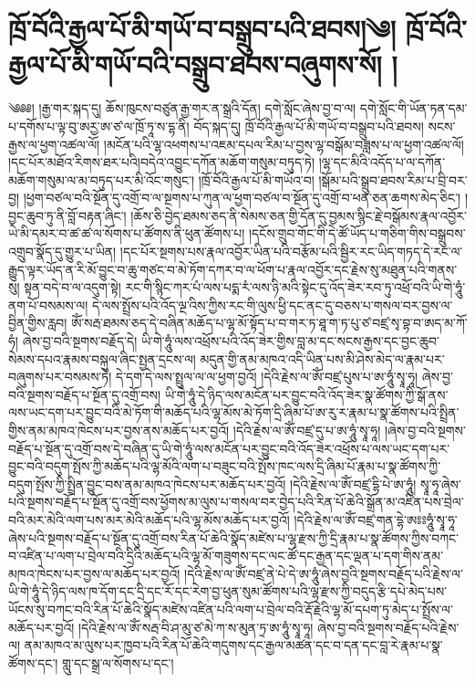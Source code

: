 \chapter{ཁྲོ་བོའི་རྒྱལ་པོ་མི་གཡོ་བ་བསྒྲུབ་པའི་ཐབས།༄། ཁྲོ་བོའི་རྒྱལ་པོ་མི་གཡོ་བའི་བསྒྲུབ་ཐབས་བཞུགས་སོ། ། }༄༅༅། །རྒྱ་གར་སྐད་དུ། ཆོས་ཁུངས་བཙུན་རྒྱ་གར་ན་སྒྲའི་དོན། དགེ་སློང་ཞེས་བྱ་བ་ལ། དགེ་སློང་གི་ཡོན་ཏན་དམ་པ་དགོས་པ་ལྟ་བུ་ཨརྱ་ཨ་ཙ་ལ་ཁྲོ་ཏཱ་ས་དྷ་ནི། བོད་སྐད་དུ། ཁྲོ་བོའི་རྒྱལ་པོ་མི་གཡོ་བ་བསྒྲུབ་པའི་ཐབས། སངས་རྒྱས་ལ་ཕྱག་འཚལ་ལོ། །མངོན་པའི་ལྷ་འཕགས་པ་འཇམ་དཔལ་རིམ་པ་བྱས་ལྷ་བསྒོམ་བཟླས་པ་ལ་ཕྱག་འཚལ་ལོ། །དང་པོར་མཐོའ་རིགས་ཐར་པའི།བདེའ་འབྱུང་དཀོན་མཆོག་གསུམ་བཏུད་ཏེ། །ལྷ་དང་མིའི་འདོད་པ་ལ་དཀོན་མཆོག་གསུམ་ལ་མ་བཏུད་པར་མི་འོང་གསུང་། །ཁྲོ་བོའི་རྒྱལ་པོ་མི་གཡོའ་བ། །སྒོམ་པའི་སྒྲུབ་ཐབས་རིམ་པ་བྲི་བར་བྱ། །ཕྱག་བཙལ་བའི་སྔོན་དུ་འགྲོ་བ་ལ་སྔགས་པ་ཀུན་ལ་ཕྱག་བཙལ་བ་སྔོན་དུ་འགྲོ་བ་ཕན་ཅན་ཆགས་མེད་ཅིང་། །བྱང་ཆུབ་ཏུ་ནི་བློ་བརྟན་ཞིང་། །ཆོས་ཅི་བྱེད་ཐམས་ཅད་ནི་སེམས་ཅན་གྱི་དོན་དུ་བྱམས་སྙིང་རྗེ་བསྒོམས་རྣལ་འབྱོར་ཡེ་མི་དམར་བ་ཚ་ཚ་ལ་སོགས་པ་ཚོགས་ནི་ཕུན་ཚོགས་པ། །དངོས་གྲུབ་གོང་གི་དེ་ཚོ་ཡོད་པ་གཅིག་གིས་བསྒྲུབས་འགྲུབ་སྣོད་དུ་གྱུར་པ་ཡིན། །དང་པོར་སྔགས་པས་རྣལ་འབྱོར་ཡིན་པའི་བརྩོམ་པའི་སྦྱིར་རང་ཡིད་གཏད་དེ་རང་ལ་རྒྱུད་ལྟར་ཡོད་ན་རི་མོ་བྱུང་བ་ཆུ་གཙང་བ་མེ་ཏོག་དཀར་བ་ལ་ཕོག་པ་རྣལ་འབྱོར་དང་རྗེས་སུ་མཐུན་པའི་གནས་སུ། སྟན་བདེ་བ་ལ་འདུག་སྟེ། རང་གི་སྙིང་ཀར་པཾ་ལས་པདྨ་རཾ་ལས་ཉི་མའི་སྟེང་དུ་འོད་ཟེར་རབ་ཏུ་འཕྲོ་བའི་ཡི་གེ་ཧཱུཾ་ནག་པོ་བསམས་ལ། དེ་ལས་སྤྲོས་པའི་འོད་ལྔ་འིས་ཀྱིས་རང་གི་ལུས་ཕྱི་དང་ནང་དུ་བཅས་པ་གསལ་བར་བྱས་ལ་བྱིན་གྱིས་རླབ། ཨོཾ་སརྦ་ཐམས་ཅད་དེ་བཞིན་མཆོད་པ་ལྷ་མོ་སྟོད་པ་བ་གར་ཏ་ཐཱ་ག་ཏ་པུ་ཙ་བཛྲ་སྭ་བྷ་བ་ཨད་མ་ཀོ་ཧཾ། ཞེས་བྱ་བའི་སྔགས་བརྗོད་དེ། ཡི་གེ་ཧཱུཾ་ལས་འཕྲོས་པའི་འོད་ཟེར་གྱིས་བླ་མ་དང་སངས་རྒྱས་དང་བྱང་ཆུབ་སེམས་དཔའ་རྣམས་བསྐུལ་ཞིང་སྤྱན་དྲངས་ལ། མདུན་གྱི་ནམ་མཁའ་འདི་ཡིན་པས་མི་ཤེས་མེད་ལ་རྣམ་པར་བཞུགས་པར་བསམས་ཏེ། དེ་དག་དེ་ལས་སྤྲུལ་ལ་ལ་ཕྱག་བྱའོ། །དེའི་རྗེས་ལ་ཨོཾ་བཛྲ་པུས་པ་ཨ་ཧཱུཾ་སྭཱ་ཧཱ། ཞེས་བྱ་བའི་སྔགས་བརྗོད་པ་སྔོན་དུ་འགྲོ་བས། ཡི་གེ་ཧཱུཾ་དེ་ཉིད་ལས་མངོན་པར་བྱུང་བའི་འོད་ཟེར་སྣ་ཚོགས་ཀྱི་སྒོ་ནས་ལས་ཡང་དག་པར་བྱུང་བའི་མེ་ཏོག་གི་མཆོད་པའི་ལྷ་མོས་མེ་ཏོག་དྲི་ཞིམ་པོ་ཨ་རུ་ར་རྣམ་པ་སྣ་ཚོགས་པའི་སྤྲིན་གྱིས་ནམ་མཁའ་ཁེངས་པར་བྱས་ནས་མཆོད་པར་བྱའོ། །དེའི་རྗེས་ལ་ཨོཾ་བཛྲ་དུ་པ་ཨ་ཧཱུཾ་སྭཱ་ཧཱ། །ཞེས་བྱ་བའི་སྔགས་བརྗོད་པ་སྔོན་དུ་འགྲོ་བས་དེ་བཞིན་དུ་ཡི་གེ་ཧཱུཾ་ལས་མངོན་པར་བྱུང་བའི་འོད་ཟེར་འཕྲོས་པ་ལས་ཡང་དག་པར་བྱུང་བའི་བདུག་སྤོས་ཀྱི་མཆོད་པའི་ལྷ་མོའི་ལག་པ་བཟུང་བའི་སྤོས་ཁང་ལས་དྲི་ཞིམ་པོ་རྣམ་པ་སྣ་ཚོགས་ཀྱི་བདུག་སྤོས་ཀྱི་སྤྲིན་བྱུང་བས་ནམ་མཁའ་ཁེངས་པར་མཆོད་པར་བྱའོ། །དེའི་རྗེས་ལ་ཨོཾ་བཛྲ་དྷི་པེ་ཨ་ཧཱུཾ། སྭཱ་ཧཱ་ཞེས་པའི་སྔགས་བརྗོད་པ་སྔོན་དུ་འགྲོ་བས་ཕྱོགས་མ་ལུས་པ་གསལ་བར་བྱེད་པའི་རིན་པོ་ཆེའི་སྒྲོན་མ་འཛིན་པས་བྲེལ་བའི་མར་མེའི་ལག་པས་མར་མེའི་མཆོད་པའི་ལྷ་མོས་མཆོད་པར་བྱའོ། །དེའི་རྗེས་ལ་ཨོཾ་བཛྲ་གན་དྷེ་ཨཿཿཧཱུཾ་སྭཱ་ཧཱ་ཞེས་པའི་སྔགས་བརྗོད་པ་སྔོན་དུ་འགྲོ་བས་རིན་པོ་ཆེའི་སྣོད་མཛེས་པ་ལྷ་རྫས་ཀྱི་དྲི་རྣམ་པ་སྣ་ཚོགས་ཀྱིས་བཀང་བ་འཛིན་པ་ལག་པ་བྲེལ་བའི་དྲིའི་མཆོད་པའི་ལྷ་མོ་གཟུགས་དང་ལང་ཚོ་དང་རྒྱན་དང་ལྡན་པ་དག་གིས་ནམ་མཁའ་ཁེངས་པར་བྱས་ལ་མཆོད་པར་བྱའོ། །དེའི་རྗེས་ལ་ཨོཾ་བཛྲ་ནེ་པེ་དེ་ཨ་ཧཱུཾ་ཞེས་བྱའི་སྔགས་བརྗོད་པའི་རྗེས་ལ་ཡི་གེ་ཧཱུཾ་དེ་ཉིད་ལས་ཁ་དོག་དང་དྲི་དང་རོ་དང་རེག་བྱ་ཕུན་སུམ་ཚོགས་པའི་ལྷ་རྫས་ཀྱི་བདུད་རྩི་དཔེ་མེད་པས་ཡོངས་སུ་བཀང་བའི་རིན་པོ་ཆེའི་སྣོད་མཛེས་འཛིན་པའི་ལག་པ་བྲེལ་བའི་རྡོ་རྗེའི་ལྷ་མོ་དཔག་ཏུ་མེད་པ་སྤྲོས་ལ་མཆོད་པར་བྱའོ། །དེའི་རྗེས་ལ་ཨོཾ་སརྦ་བི་ཤ་མུ་ཙ་མེ་ཀ་ས་མུན་ཏྲ་ཨ་ཧཱུཾ་སྭཱ་ཧཱ། ཞེས་བྱ་བའི་སྔགས་བརྗོད་པའི་རྗེས་ལ། ནམ་མཁའ་མ་ལུས་པར་ཁྱབ་པའི་རིན་པོ་ཆེའི་གདུགས་དང་རྒྱལ་མཚན་དང་བ་དན་དང་བླ་རེ་རྣམ་པ་སྣ་ཚོགས་དང་། གླུ་དང་སྒྲ་ལ་སོགས་པ་དང་། 